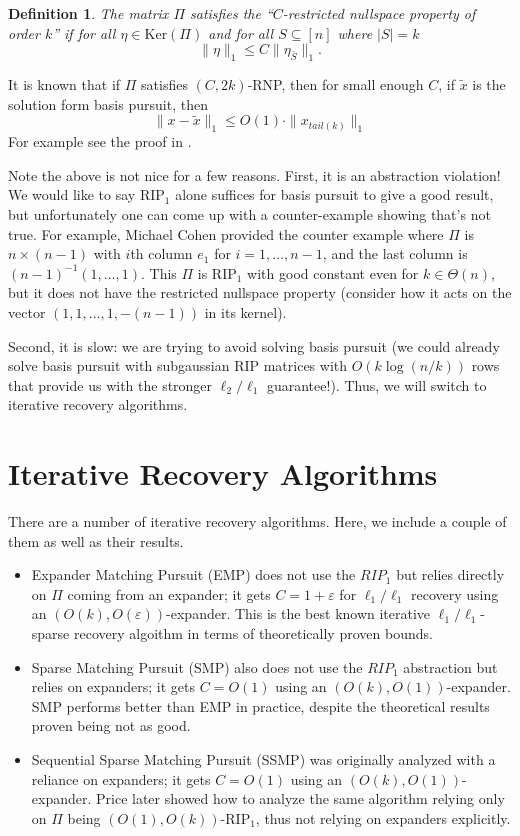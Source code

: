 \documentclass[11pt]{article}
\newtheorem{definition}[theorem]{Definition}
\begin{document}
\begin{definition}
	The matrix $\Pi$ satisfies the ``$C$-restricted nullspace property of order $k$'' if for all $\eta \in \mathrm{Ker}(\Pi)$ and for all $S \subseteq [n]$ where $|S| = k$
	\[
		\| \eta \|_1 \leq C \| \eta_{\bar{S}} \|_1 .
	\] 
\end{definition}

It is known that if $\Pi$ satisfies $(C, 2k)$-RNP, then for small enough $C$, if $\tilde{x}$ is the solution form basis pursuit, then
\[
	\| x - \tilde{x} \|_1 \leq O(1) \cdot \| x_{tail(k)}  \|_1 
\]
For example see the proof in \cite{IndykR13}.

Note the above is not nice for a few reasons. First, it is an abstraction violation! We would like to say RIP$_1$ alone suffices for basis pursuit to give a good result, but unfortunately one can come up with a counter-example showing that's not true. For example, Michael Cohen provided the counter example where $\Pi$ is $n\times (n-1)$ with $i$th column $e_1$ for $i=1,\ldots,n-1$, and the last column is $(n-1)^{-1}(1,\ldots,1)$. This $\Pi$ is RIP$_1$ with good constant even for $k\in\Theta(n)$, but it does not have the restricted nullspace property (consider how it acts on the vector $(1,1,\ldots,1, - (n-1))$ in its kernel).

Second, it is slow: we are trying to avoid solving basis pursuit (we could already solve basis pursuit with subgaussian RIP matrices with $O(k\log(n/k))$ rows that provide us with the stronger $\ell_2/\ell_1$ guarantee!). Thus, we will switch to iterative recovery algorithms.

\section{Iterative Recovery Algorithms}
There are a number of iterative recovery algorithms. Here, we include a couple of them as well as their results.

\begin{itemize}
    \item Expander Matching Pursuit (EMP) \cite{indyk2008near} does not use the $RIP_1$ but relies directly on $\Pi$ coming from an expander; it gets $C = 1 + \varepsilon$ for $\ell_1 / \ell_1$ recovery using an $(O(k), O(\varepsilon))$-expander. This is the best known iterative $\ell_1/\ell_1$-sparse recovery algoithm in terms of theoretically proven bounds.
    \item Sparse Matching Pursuit (SMP) \cite{BGI08} also does not use the $RIP_1$ abstraction but relies on expanders; it gets $C = O(1)$ using an $(O(k), O(1))$-expander. SMP performs better than EMP in practice, despite the theoretical results proven being not as good.
    \item Sequential Sparse Matching Pursuit (SSMP) \cite{BerindeI09} was originally analyzed with a reliance on expanders; it gets $C = O(1)$ using an $(O(k), O(1))$-expander. Price \cite{Price10} later showed how to analyze the same algorithm relying only on $\Pi$ being $(O(1),O(k))$-RIP$_1$, thus not relying on expanders explicitly.
\end{itemize}
\end{document}
